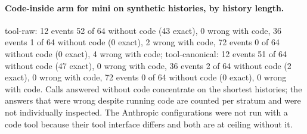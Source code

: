\paragraph{Code-inside arm for mini on synthetic histories, by history length.} tool-raw: 12 events 52 of 64 without code (43 exact), 0 wrong with code, 36 events 1 of 64 without code (0 exact), 2 wrong with code, 72 events 0 of 64 without code (0 exact), 4 wrong with code; tool-canonical: 12 events 51 of 64 without code (47 exact), 0 wrong with code, 36 events 2 of 64 without code (2 exact), 0 wrong with code, 72 events 0 of 64 without code (0 exact), 0 wrong with code. Calls answered without code concentrate on the shortest histories; the answers that were wrong despite running code are counted per stratum and were not individually inspected. The Anthropic configurations were not run with a code tool because their tool interface differs and both are at ceiling without it.

